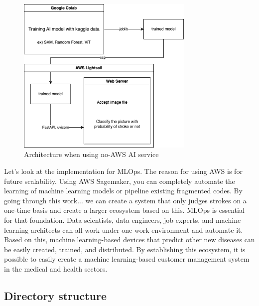 \begin{figure}[H]
    \centering
    \includegraphics[width=8.5cm]{images/ai-back.drawio (1).png}
    \caption{Architecture when using no-AWS AI service}
\end{figure}


Let's look at the implementation for MLOps. The reason for using AWS is for future scalability. Using AWS Sagemaker, you can completely automate the learning of machine learning models or pipeline existing fragmented codes. By going through this work... we can create a system that only judges strokes on a one-time basis and create a larger ecosystem based on this. MLOps is essential for that foundation. Data scientists, data engineers, job experts, and machine learning architects can all work under one work environment and automate it. Based on this, machine learning-based devices that predict other new diseases can be easily created, trained, and distributed. By establishing this ecosystem, it is possible to easily create a machine learning-based customer management system in the medical and health sectors.


\subsection{Directory structure}

